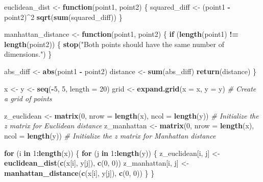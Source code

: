 \documentclass[
]{article}
\newenvironment{Shaded}{\begin{snugshade}}{\end{snugshade}}
\newcommand{\AttributeTok}[1]{\textcolor[rgb]{0.13,0.29,0.53}{#1}}
\newcommand{\CommentTok}[1]{\textcolor[rgb]{0.56,0.35,0.01}{\textit{#1}}}
\newcommand{\ControlFlowTok}[1]{\textcolor[rgb]{0.13,0.29,0.53}{\textbf{#1}}}
\newcommand{\DecValTok}[1]{\textcolor[rgb]{0.00,0.00,0.81}{#1}}
\newcommand{\FunctionTok}[1]{\textcolor[rgb]{0.13,0.29,0.53}{\textbf{#1}}}
\newcommand{\NormalTok}[1]{#1}
\newcommand{\OtherTok}[1]{\textcolor[rgb]{0.56,0.35,0.01}{#1}}
\newcommand{\SpecialCharTok}[1]{\textcolor[rgb]{0.81,0.36,0.00}{\textbf{#1}}}
\newcommand{\StringTok}[1]{\textcolor[rgb]{0.31,0.60,0.02}{#1}}
\begin{document}
\begin{Shaded}
\begin{Highlighting}[]
\NormalTok{euclidean\_dist }\OtherTok{\textless{}{-}} \ControlFlowTok{function}\NormalTok{(point1, point2) \{}
\NormalTok{  squared\_diff }\OtherTok{\textless{}{-}}\NormalTok{ (point1 }\SpecialCharTok{{-}}\NormalTok{ point2)}\SpecialCharTok{\^{}}\DecValTok{2}
  \FunctionTok{sqrt}\NormalTok{(}\FunctionTok{sum}\NormalTok{(squared\_diff))}
\NormalTok{\}}

\NormalTok{manhattan\_distance }\OtherTok{\textless{}{-}} \ControlFlowTok{function}\NormalTok{(point1, point2) \{}
  \ControlFlowTok{if}\NormalTok{ (}\FunctionTok{length}\NormalTok{(point1) }\SpecialCharTok{!=} \FunctionTok{length}\NormalTok{(point2)) \{}
    \FunctionTok{stop}\NormalTok{(}\StringTok{"Both points should have the same number of dimensions."}\NormalTok{)}
\NormalTok{  \}}

\NormalTok{  abs\_diff }\OtherTok{\textless{}{-}} \FunctionTok{abs}\NormalTok{(point1 }\SpecialCharTok{{-}}\NormalTok{ point2)}
\NormalTok{  distance }\OtherTok{\textless{}{-}} \FunctionTok{sum}\NormalTok{(abs\_diff)}
  \FunctionTok{return}\NormalTok{(distance)}
\NormalTok{\}}

\NormalTok{x }\OtherTok{\textless{}{-}}\NormalTok{ y }\OtherTok{\textless{}{-}} \FunctionTok{seq}\NormalTok{(}\SpecialCharTok{{-}}\DecValTok{5}\NormalTok{, }\DecValTok{5}\NormalTok{, }\AttributeTok{length =} \DecValTok{20}\NormalTok{)}
\NormalTok{grid }\OtherTok{\textless{}{-}} \FunctionTok{expand.grid}\NormalTok{(}\AttributeTok{x =}\NormalTok{ x, }\AttributeTok{y =}\NormalTok{ y)  }\CommentTok{\# Create a grid of points}

\NormalTok{z\_euclidean }\OtherTok{\textless{}{-}} \FunctionTok{matrix}\NormalTok{(}\DecValTok{0}\NormalTok{, }\AttributeTok{nrow =} \FunctionTok{length}\NormalTok{(x), }\AttributeTok{ncol =} \FunctionTok{length}\NormalTok{(y))  }\CommentTok{\# Initialize the z matrix for Euclidean distance}
\NormalTok{z\_manhattan }\OtherTok{\textless{}{-}} \FunctionTok{matrix}\NormalTok{(}\DecValTok{0}\NormalTok{, }\AttributeTok{nrow =} \FunctionTok{length}\NormalTok{(x), }\AttributeTok{ncol =} \FunctionTok{length}\NormalTok{(y))   }\CommentTok{\# Initialize the z matrix for Manhattan distance}

\ControlFlowTok{for}\NormalTok{ (i }\ControlFlowTok{in} \DecValTok{1}\SpecialCharTok{:}\FunctionTok{length}\NormalTok{(x)) \{}
  \ControlFlowTok{for}\NormalTok{ (j }\ControlFlowTok{in} \DecValTok{1}\SpecialCharTok{:}\FunctionTok{length}\NormalTok{(y)) \{}
\NormalTok{    z\_euclidean[i, j] }\OtherTok{\textless{}{-}} \FunctionTok{euclidean\_dist}\NormalTok{(}\FunctionTok{c}\NormalTok{(x[i], y[j]), }\FunctionTok{c}\NormalTok{(}\DecValTok{0}\NormalTok{, }\DecValTok{0}\NormalTok{))}
\NormalTok{    z\_manhattan[i, j] }\OtherTok{\textless{}{-}} \FunctionTok{manhattan\_distance}\NormalTok{(}\FunctionTok{c}\NormalTok{(x[i], y[j]), }\FunctionTok{c}\NormalTok{(}\DecValTok{0}\NormalTok{, }\DecValTok{0}\NormalTok{))}
\NormalTok{  \}}
\NormalTok{\}}


\end{Highlighting}
\end{Shaded}
\end{document}
